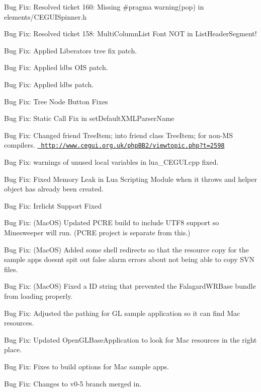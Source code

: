\begin{DoxyItemize}
\item Bug Fix\+: Resolved ticket 160\+: Missing \#pragma warning(pop) in elements/\+C\+E\+G\+U\+I\+Spinner.\+h
\item Bug Fix\+: Resolved ticket 158\+: Multi\+Column\+List Font N\+OT in List\+Header\+Segment!
\item Bug Fix\+: Applied Liberator\textquotesingle{}s tree fix patch.
\item Bug Fix\+: Applied ldb\textquotesingle{}s O\+IS patch.
\item Bug Fix\+: Applied ldb\textquotesingle{}s patch.
\item Bug Fix\+: Tree Node Button Fixes
\item Bug Fix\+: Static Call Fix in set\+Default\+X\+M\+L\+Parser\+Name
\item Bug Fix\+: Changed \textquotesingle{}friend Tree\+Item;\textquotesingle{} into \textquotesingle{}friend class Tree\+Item;\textquotesingle{} for non-\/\+MS compilers. \href{http://www.cegui.org.uk/phpBB2/viewtopic.php?t=2598}{\texttt{ http\+://www.\+cegui.\+org.\+uk/php\+B\+B2/viewtopic.\+php?t=2598}}
\item Bug Fix\+: warnings of unused local variables in lua\+\_\+\+C\+E\+G\+U\+I.\+cpp fixed.
\item Bug Fix\+: Fixed Memory Leak in Lua Scripting Module when it throws and helper object has already been created.
\item Bug Fix\+: Irrlicht Support Fixed
\item Bug Fix\+: (Mac\+OS) Updated P\+C\+RE build to include U\+T\+F8 support so Minesweeper will run. (P\+C\+RE project is separate from this.)
\item Bug Fix\+: (Mac\+OS) Added some shell redirects so that the resource copy for the sample apps doesn\textquotesingle{}t spit out false alarm errors about not being able to copy S\+VN files.
\item Bug Fix\+: (Mac\+OS) Fixed a ID string that prevented the Falagard\+W\+R\+Base bundle from loading properly.
\item Bug Fix\+: Adjusted the pathing for GL sample application so it can find Mac resources.
\item Bug Fix\+: Updated Open\+G\+L\+Base\+Application to look for Mac resources in the right place.
\item Bug Fix\+: Fixes to build options for Mac sample apps.
\item Bug Fix\+: Changes to v0-\/5 branch merged in.
\end{DoxyItemize}


